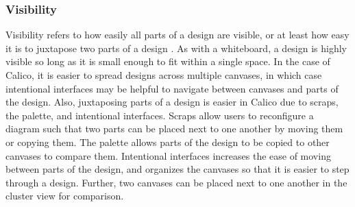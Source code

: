



\subsubsection{Visibility}

Visibility refers to how easily all parts of a design are visible, or at least how easy it is to juxtapose two parts of a design \cite{Petre2013BookChapter}. As with a whiteboard, a design is highly visible so long as it is small enough to fit within a single space. In the case of Calico, it is easier to spread designs across multiple canvases, in which case intentional interfaces may be helpful to navigate between canvases and parts of the design. Also, juxtaposing parts of a design is easier in Calico due to scraps, the palette, and intentional interfaces. Scraps allow users to reconfigure a diagram such that two parts can be placed next to one another by moving them or copying them. The palette allows parts of the design to be copied to other canvases to compare them. Intentional interfaces increases the ease of moving between parts of the design, and organizes the canvases so that it is easier to step through a design. Further, two canvases can be placed next to one another in the cluster view for comparison.

